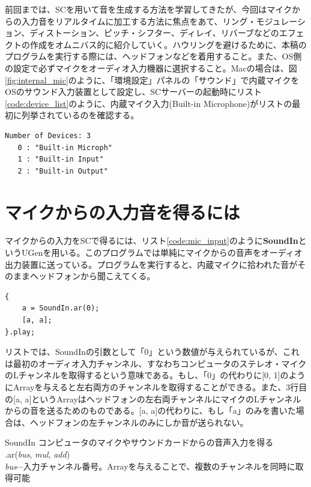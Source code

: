 \documentclass{jsarticle}
\begin{document}
\begin{figure}

\end{figure}
前回までは、SCを用いて音を生成する方法を学習してきたが、今回はマイクからの入力音をリアルタイムに加工する方法に焦点をあて、リング・モジュレーション、ディストーション、ピッチ・シフター、ディレイ、リバーブなどのエフェクトの作成をオムニバス的に紹介していく。ハウリングを避けるために、本稿のプログラムを実行する際には、ヘッドフォンなどを着用すること。また、OS側の設定で必ずマイクをオーディオ入力機器に選択すること。Macの場合は、図\ref{fig:internal_mic}のように、「環境設定」パネルの「サウンド」で内蔵マイクをOSのサウンド入力装置として設定し、SCサーバーの起動時にリスト\ref{code:device_list}のように、内蔵マイク入力(Built-in Microphone)がリストの最初に列挙されているのを確認する。

\begin{lstlisting}[caption=入出力デバイスのリスト,label=code:device_list]
Number of Devices: 3
   0 : "Built-in Microph"
   1 : "Built-in Input"
   2 : "Built-in Output"
\end{lstlisting}

\section{マイクからの入力音を得るには}
マイクからの入力をSCで得るには、リスト\ref{code:mic_input}のように{\bf SoundIn}というUGenを用いる。このプログラムでは単純にマイクからの音声をオーディオ出力装置に送っている。プログラムを実行すると、内蔵マイクに拾われた音がそのままヘッドフォンから聞こえてくる。

\begin{lstlisting}[caption=マイク入力,label=code:mic_input]
{
	a = SoundIn.ar(0);
	[a, a];
}.play;
\end{lstlisting}

リストでは、SoundInの引数として「0」という数値が与えられているが、これは最初のオーディオ入力チャンネル、すなわちコンピュータのステレオ・マイクのLチャンネルを取得するという意味である。もし、「0」の代わりに[0, 1]のようにArrayを与えると左右両方のチャンネルを取得することができる。また、3行目の[a, a]というArrayはヘッドフォンの左右両チャンネルにマイクのLチャンネルからの音を送るためのものである。[a, a]の代わりに、もし「a」のみを書いた場合は、ヘッドフォンの左チャンネルのみにしか音が送られない。
\begin{itembox}[l]{SoundIn}
{\footnotesize 
コンピュータのマイクやサウンドカードからの音声入力を得る\\
.ar({\it bus}, {\it mul}, {\it add})\\
{\it bus}$\cdots$入力チャンネル番号。Arrayを与えることで、複数のチャンネルを同時に取得可能\\
}
\end{itembox}
\end{document}
